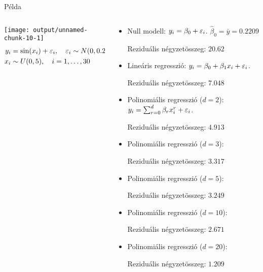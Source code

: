 \documentclass[aspectratio=169,notheorems,9pt,\option]{beamer}\usepackage[]{graphicx}\usepackage[]{color}
\makeatletter
\def\maxwidth{ %
  \ifdim\Gin@nat@width>\linewidth
    \linewidth
  \else
    \Gin@nat@width
  \fi
}
\newenvironment{knitrout}{}{} %
\makeatother
\begin{document}
\begin{frame}{Példa}
\begin{columns}[t]
\begin{column}[T]{0.5\textwidth}
{\begin{knitrout}
\color{fgcolor}
\texttt{[image: output/unnamed-chunk-10-1]} 
\end{knitrout}
      }
      \begin{align*}
        y_i&=\sin(x_i)+\varepsilon_i,
        \quad \varepsilon_i\sim N(0,0.25^2)\\
        x_i&\sim U(0,5),
        \quad i=1,\dots,30
      \end{align*}
    \end{column}
    \begin{column}{0.5\textwidth}
      \begin{itemize}
        \item  Null modell: $y_i=\beta_0 + \varepsilon_i$. 
        $\hat\beta_0=\bar{y}=0.2209$
        
        Reziduális négyzetösszeg: $20.62$
        
        \item Lineáris regresszió: $y_i=\beta_0 +\beta_1 x_i+ \varepsilon_i$.
        
        Reziduális négyzetösszeg: $7.048$
        
        \item Polinomiális regresszió ($d=2$): 
        $y_i=\sum_{r=0}^d\beta_r x_i^r+ \varepsilon_i$.
        
        Reziduális négyzetösszeg: $4.913$
        
        \item Polinomiális regresszió ($d=3$): 
        
        Reziduális négyzetösszeg: $3.317$
        
        \item Polinomiális regresszió ($d=5$): 
        
        
        Reziduális négyzetösszeg: $3.249$
        \item Polinomiális regresszió ($d=10$): 
        
        Reziduális négyzetösszeg: $2.671$
        
        \item Polinomiális regresszió ($d=20$): 
        
        Reziduális négyzetösszeg: $1.209$
      \end{itemize}
    \end{column}
  \end{columns}
\end{frame}
\end{document}
